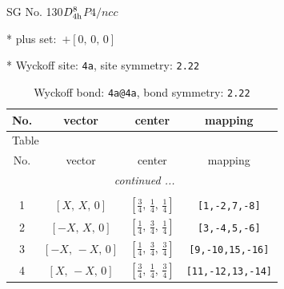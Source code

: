 \documentclass[fleqn,8pt]{jsarticle}
\begin{document}
\setcounter{MaxMatrixCols}{32}

\renewcommand{\tablename}{Table~}
\renewcommand{\figurename}{Figure~}
\begin{center}
\LARGE
SG No. 130\quad$D_{\rm 4h}^{8}$\quad$P4/ncc$\quad[ tetragonal ]
\end{center}

* plus set:\,\,\,$+\left[ 0,\, 0,\, 0 \right]$


* Wyckoff site: {\tt 4a}, site symmetry: {\tt 2.22}
\renewcommand{\arraystretch}{1.2}
\begin{longtable}{cccc}
\caption{Wyckoff bond: {\tt 4a@4a}, bond symmetry: {\tt 2.22}}
 \\
 \hline \hline
No. & vector & center & mapping \\ \hline \endfirsthead

\multicolumn{3}{l}{\tablename\ \thetable{}} \\
 \hline \hline
No. & vector & center & mapping \\ \hline \endhead

 \hline \hline
\multicolumn{3}{r}{\footnotesize\it continued ...} \\ \endfoot

 \hline \hline
\multicolumn{3}{r}{} \\ \endlastfoot

1 & $\left[ X,\, X,\, 0 \right]$ & $\left[ \frac{3}{4},\, \frac{1}{4},\, \frac{1}{4} \right]$ & {\tt [1,-2,7,-8]} \\ \hline
2 & $\left[ - X,\, X,\, 0 \right]$ & $\left[ \frac{1}{4},\, \frac{3}{4},\, \frac{1}{4} \right]$ & {\tt [3,-4,5,-6]} \\ \hline
3 & $\left[ - X,\, - X,\, 0 \right]$ & $\left[ \frac{1}{4},\, \frac{3}{4},\, \frac{3}{4} \right]$ & {\tt [9,-10,15,-16]} \\ \hline
4 & $\left[ X,\, - X,\, 0 \right]$ & $\left[ \frac{3}{4},\, \frac{1}{4},\, \frac{3}{4} \right]$ & {\tt [11,-12,13,-14]} \\
\end{longtable}
\renewcommand{\arraystretch}{1.2}
\end{document}
